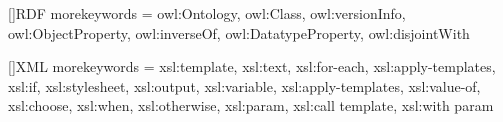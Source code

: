 []{RDF}{%
	morekeywords = {owl:Ontology, owl:Class, owl:versionInfo,
			owl:ObjectProperty, owl:inverseOf,
			owl:DatatypeProperty, owl:disjointWith
	}
}




[]{XML}{%
	morekeywords = {xsl:template, xsl:text, xsl:for-each,
			xsl:apply-templates, xsl:if, xsl:stylesheet,
			xsl:output, xsl:variable, xsl:apply-templates,
			xsl:value-of, xsl:choose, xsl:when, xsl:otherwise,
			xsl:param, xsl:call template, xsl:with param
	}
}
